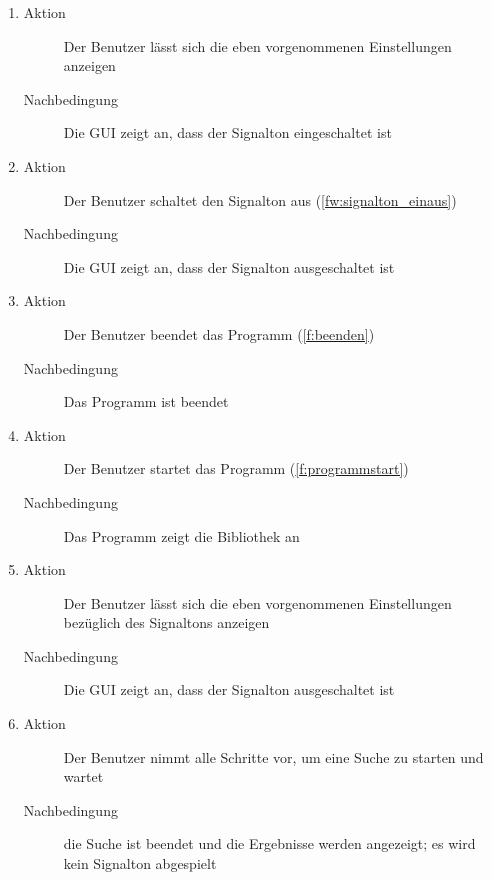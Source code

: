 \begin{enumerate} [label=\bfseries /TSW \arabic*0/, leftmargin=*]
\begin{enumerate}[leftmargin=0pt]
		\item
		\begin{description}
			\item[Aktion] Der Benutzer lässt sich die eben vorgenommenen Einstellungen anzeigen
			\item[Nachbedingung] Die GUI zeigt an, dass der Signalton eingeschaltet ist
		\end{description}
		\item
		\begin{description}
			\item[Aktion] Der Benutzer schaltet den Signalton aus (\ref{fw:signalton_einaus})
			\item[Nachbedingung] Die GUI zeigt an, dass der Signalton ausgeschaltet ist
		\end{description}
		\item
		\begin{description}
			\item[Aktion] Der Benutzer beendet das Programm (\ref{f:beenden})
			\item[Nachbedingung] Das Programm ist beendet
		\end{description}
		\item
		\begin{description}
			\item[Aktion] Der Benutzer startet das Programm (\ref{f:programmstart})
			\item[Nachbedingung] Das Programm zeigt die Bibliothek an
		\end{description}
		\item
		\begin{description}
			\item[Aktion] Der Benutzer lässt sich die eben vorgenommenen Einstellungen bezüglich des Signaltons anzeigen
			\item[Nachbedingung] Die GUI zeigt an, dass der Signalton ausgeschaltet ist
		\end{description}
		\item
		\begin{description}
			\item[Aktion] Der Benutzer nimmt alle Schritte vor, um eine Suche zu starten und wartet
			\item[Nachbedingung] die Suche ist beendet und die Ergebnisse werden angezeigt; es wird kein Signalton abgespielt
		\end{description}
	\end{enumerate}


\end{enumerate}

